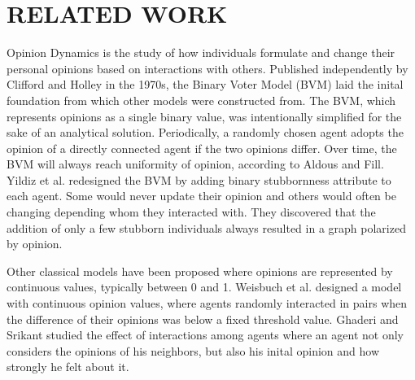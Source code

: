 
\section{RELATED WORK}

Opinion Dynamics is the study of how individuals formulate and change their personal 
opinions based on interactions with others. Published independently by Clifford and 
Holley in the 1970s, the Binary Voter Model (BVM) laid the inital foundation from 
which other models were constructed from. The BVM, which represents opinions as a 
single binary value, was intentionally simplified for the sake of an analytical 
solution. Periodically, a randomly chosen agent adopts the opinion of a directly 
connected agent if the two opinions differ. Over time, the BVM will always reach 
uniformity of opinion, according to Aldous and Fill. Yildiz et al. redesigned the
BVM by adding binary stubbornness attribute to each agent. Some would never update
their opinion and others would often be changing depending whom they interacted with.
They discovered that the addition of only a few stubborn individuals always resulted 
in a graph polarized by opinion.

Other classical models have been proposed where opinions are represented by continuous 
values, typically between 0 and 1. Weisbuch et al. designed a model with continuous
opinion values, where agents randomly interacted in pairs when the difference of their 
opinions was below a fixed threshold value. Ghaderi and Srikant studied the effect of
interactions among agents where an agent not only considers the opinions of his neighbors,
but also his inital opinion and how strongly he felt about it.






